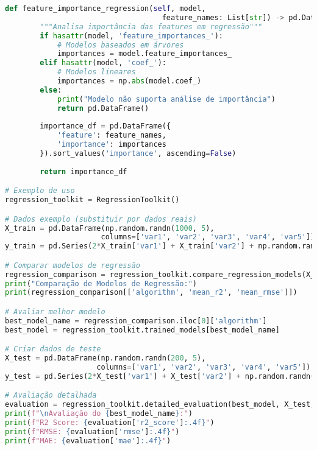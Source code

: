 \begin{pythonbox}
\begin{lstlisting}[language=Python]  
    def feature_importance_regression(self, model, 
                                    feature_names: List[str]) -> pd.DataFrame:
        """Analisa importância das features em regressão"""
        if hasattr(model, 'feature_importances_'):
            # Modelos baseados em árvores
            importances = model.feature_importances_
        elif hasattr(model, 'coef_'):
            # Modelos lineares
            importances = np.abs(model.coef_)
        else:
            print("Modelo não suporta análise de importância")
            return pd.DataFrame()
        
        importance_df = pd.DataFrame({
            'feature': feature_names,
            'importance': importances
        }).sort_values('importance', ascending=False)
        
        return importance_df

# Exemplo de uso
regression_toolkit = RegressionToolkit()

# Dados exemplo (substituir por dados reais)
X_train = pd.DataFrame(np.random.randn(1000, 5), 
                      columns=['var1', 'var2', 'var3', 'var4', 'var5'])
y_train = pd.Series(2*X_train['var1'] + X_train['var2'] + np.random.randn(1000)*0.5)

# Comparar modelos de regressão
regression_comparison = regression_toolkit.compare_regression_models(X_train, y_train)
print("Comparação de Modelos de Regressão:")
print(regression_comparison[['algorithm', 'mean_r2', 'mean_rmse']])

# Avaliar melhor modelo
best_model_name = regression_comparison.iloc[0]['algorithm']
best_model = regression_toolkit.trained_models[best_model_name]

# Criar dados de teste
X_test = pd.DataFrame(np.random.randn(200, 5), 
                     columns=['var1', 'var2', 'var3', 'var4', 'var5'])
y_test = pd.Series(2*X_test['var1'] + X_test['var2'] + np.random.randn(200)*0.5)

# Avaliação detalhada
evaluation = regression_toolkit.detailed_evaluation(best_model, X_test, y_test, best_model_name)
print(f"\nAvaliação do {best_model_name}:")
print(f"R2 Score: {evaluation['r2_score']:.4f}")
print(f"RMSE: {evaluation['rmse']:.4f}")
print(f"MAE: {evaluation['mae']:.4f}")
\end{lstlisting}
\end{pythonbox}

